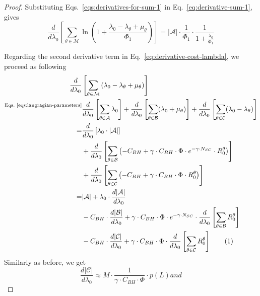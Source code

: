 \documentclass[10pt,conference,letterpaper]{IEEEtran}
\newcommand{\eq}[1]{Eq.~\eqref{#1}}
\newcommand{\eqs}[1]{Eqs.~\eqref{#1}}
\newcommand\numberthis{\addtocounter{equation}{1}\tag{\theequation}}
\begin{document}
\begin{proof}
Substituting \eqs{eqs:derivatives-for-sum-1} in \eq{eq:derivative-sum-1}, gives 
\begin{equation}\label{eq:derivative-sum-1-final}
 \frac{d}{d\lambda_{0}}\left[\sum_{\theta\in\mathcal{M}}\ln\left(1+\frac{\lambda_{0}-\lambda_{\theta}+\mu_{\theta}}{\Phi_{1}} \right ) \right ] = |\mathcal{A}| \cdot \frac{1}{\Phi_{1}}\cdot \frac{1}{1+\frac{\lambda_{0}}{\Phi_{1}}}
\end{equation}

Regarding the second derivative term in \eq{eq:derivative-cost-lambda}, we proceed as following
\begin{align*}\label{eq:derivative-sum-2}
\frac{d}{d\lambda_{0}}&\left[\sum_{\theta\in\mathcal{M}}\left(\lambda_{0}-\lambda_{\theta}+\mu_{\theta}\right) \right ] \\
\stackrel{\text{\eqs{eqs:langragian-parameters}}}{=} 
	&\frac{d}{d\lambda_{0}}\left[\sum_{\theta\in\mathcal{A}}\lambda_{0}\right]+\frac{d}{d\lambda_{0}}\left[\sum_{\theta\in\mathcal{B}}(\lambda_{0}+\mu_{\theta})\right]+\frac{d}{d\lambda_{0}}\left[\sum_{\theta\in\mathcal{C}}(\lambda_{0}-\lambda_{\theta})\right]\\ 
=
	&\frac{d}{d\lambda_{0}}\left[\lambda_{0}\cdot |\mathcal{A}|\right]\\
	&+\frac{d}{d\lambda_{0}}\left[\sum_{\theta\in\mathcal{B}}\left(-C_{BH}+\gamma\cdot C_{BH}\cdot\Phi\cdot e^{-\gamma\cdot N_{SC}} \cdot R_{0}^{\theta}\right)\right]\\
	&+\frac{d}{d\lambda_{0}}\left[\sum_{\theta\in\mathcal{C}}\left(-C_{BH}+\gamma\cdot C_{BH}\cdot\Phi\cdot R_{0}^{\theta}\right)\right]\\
=
	&|\mathcal{A}|+ \lambda_{0}\cdot \frac{d|\mathcal{A}|}{d\lambda_{0}}\\
	&-C_{BH}\cdot \frac{d|\mathcal{B}|}{d\lambda_{0}}+\gamma\cdot C_{BH}\cdot\Phi\cdot e^{-\gamma\cdot N_{SC}} \cdot \frac{d}{d\lambda_{0}}\left[\sum_{\theta\in\mathcal{B}}R_{0}^{\theta}\right]\\
	&-C_{BH}\cdot \frac{d|\mathcal{C}|}{d\lambda_{0}}+\gamma\cdot C_{BH}\cdot\Phi\cdot \frac{d}{d\lambda_{0}}\left[\sum_{\theta\in\mathcal{C}}R_{0}^{\theta}\right]\numberthis
\end{align*}
Similarly as before, we get
\begin{subequations}\label{eqs:derivatives-for-sum-2}
\begin{equation}
 \frac{d|\mathcal{C}|}{d\lambda_{0}} \approx M\cdot \frac{1}{\gamma\cdot  C_{BH}\cdot\Phi}\cdot p(L)
\end{equation}
and 

\end{subequations}
\end{proof}
\end{document}

